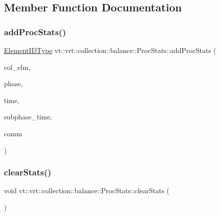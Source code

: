 \subsection{Member Function Documentation}
\mbox{\label{structvt_1_1vrt_1_1collection_1_1balance_1_1_proc_stats_a21164188d5d1d09724959e95e5c4f2e4}} 
\subsubsection{\texorpdfstring{add\+Proc\+Stats()}{addProcStats()}}
{\footnotesize\ttfamily \hyperlink{namespacevt_1_1vrt_1_1collection_1_1balance_a14c8d2c972f2913aa3f1636e5be0a120}{Element\+I\+D\+Type} vt\+::vrt\+::collection\+::balance\+::\+Proc\+Stats\+::add\+Proc\+Stats (\begin{DoxyParamCaption}\item[{\hyperlink{structvt_1_1vrt_1_1collection_1_1_migratable}{Migratable} $\ast$}]{col\+\_\+elm,  }\item[{\hyperlink{namespacevt_a46ce6733d5cdbd735d561b7b4029f6d7}{Phase\+Type} const \&}]{phase,  }\item[{\hyperlink{namespacevt_a876a9d0cd5a952859c72de8a46881442}{Time\+Type} const \&}]{time,  }\item[{std\+::vector$<$ \hyperlink{namespacevt_a876a9d0cd5a952859c72de8a46881442}{Time\+Type} $>$ const \&}]{subphase\+\_\+time,  }\item[{\hyperlink{namespacevt_1_1vrt_1_1collection_1_1balance_aa50d4cbbfa3c643e7303fc6e08f411fb}{Comm\+Map\+Type} const \&}]{comm }\end{DoxyParamCaption})}

\mbox{\label{structvt_1_1vrt_1_1collection_1_1balance_1_1_proc_stats_a9a47e5d00d2645f76f2a21e75996fe8b}} 
\subsubsection{\texorpdfstring{clear\+Stats()}{clearStats()}}
{\footnotesize\ttfamily void vt\+::vrt\+::collection\+::balance\+::\+Proc\+Stats\+::clear\+Stats (\begin{DoxyParamCaption}{ }\end{DoxyParamCaption})}

